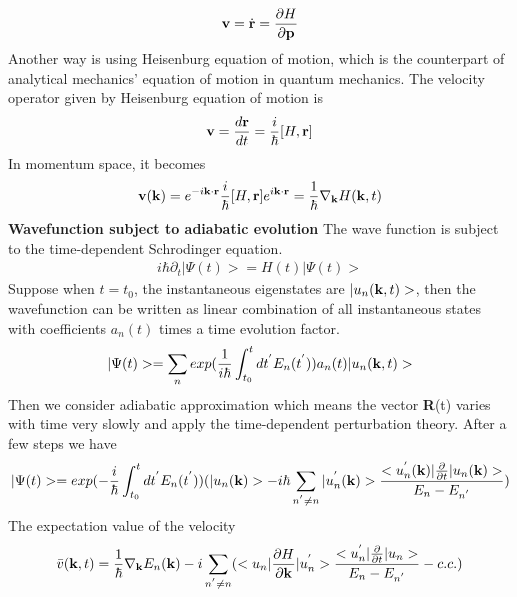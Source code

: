 \documentclass[a4paper]{article}
\begin{document}
\begin{align*}
	{\bf v} = \dot{{\bf r}} = \frac{\partial H}{\partial {\bf p}}
\end{align*}
Another way is using Heisenburg equation of motion, which is the counterpart of analytical mechanics' equation of motion in quantum mechanics. The velocity operator given by Heisenburg equation of motion is
\begin{align*}
	{\bf v} = \frac{d{\bf r}}{dt} = \frac{i}{\hbar}[H, {\bf r}]
\end{align*}
In momentum space, it becomes
\begin{align*}
	{\bf v}({\bf k}) = e^{-i{\bf k} \cdot {\bf r}} \frac{i}{\hbar}[H, {\bf r}] e^{i{\bf k} \cdot {\bf r}} = \frac{1}{\hbar} \nabla_{\bf k} H({\bf k},t)
\end{align*}
{\bf Wavefunction subject to adiabatic evolution }
The wave function is subject to the time-dependent Schrodinger equation.
\begin{align*}
	i \hbar \partial_t |\Psi(t) > = H(t) |\Psi(t)> 
\end{align*}
Suppose when $t= t_0$, the instantaneous eigenstates are $|u_n({\bf k}, t)>$, then
the wavefunction can be written as linear combination of all instantaneous states with coefficients $a_n(t)$ times a time evolution factor.  
\begin{align*}
	|\Psi(t)> = \sum_n exp(\frac{1}{i\hbar} \int_{t_0}^t dt^{'} E_n(t^{'})) a_n(t) |u_n({\bf k}, t)>
\end{align*}
Then we consider adiabatic approximation which means the vector {\bf R}(t) varies with time very slowly and apply the time-dependent perturbation theory. After a few steps we have
\begin{align*}
	|\Psi(t)>= exp(-\frac{i}{\hbar}\int_{t_0}^{t} dt^{'} E_{n}(t^{'}))(|u_n({\bf k})> 
	-i\hbar \sum_{n^{'}\neq n} |u_n^{'}({\bf k})>\frac{<u_n^{'}({\bf k})|\frac{\partial}{\partial t}|u_n({\bf k})>}{E_{n} - E_{n^{'}}})
\end{align*}
The expectation value of the velocity
\begin{align*}
	\bar v({\bf k},t) = \frac{1}{\hbar} \nabla_{\bf k} E_n({\bf k}) 
	- i \sum_{n^{'}\neq n} (<u_n|\frac{\partial H}{\partial {\bf k}}|u_n^{'}>\frac{<u_n^{'}|\frac{\partial}{\partial t}|u_n>}{E_{n} - E_{n^{'}}} - c.c.)
\end{align*}
\end{document}
